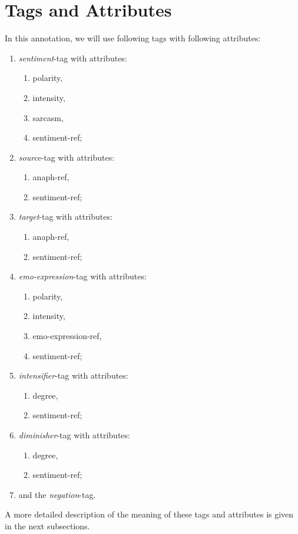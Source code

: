 \documentclass[11pt,a4paper]{article}
\begin{document}

\section{Tags and Attributes}
In this annotation, we will use following tags with following
attributes:
\begin{enumerate}
\item \textit{sentiment}-tag with attributes:
  \begin{enumerate}
  \item polarity,
  \item intensity,
  \item sarcasm,
  \item sentiment-ref;
  \end{enumerate}
\item \textit{source}-tag with attributes:
  \begin{enumerate}
  \item anaph-ref,
  \item sentiment-ref;
  \end{enumerate}
\item \textit{target}-tag with attributes:
  \begin{enumerate}
  \item anaph-ref,
  \item sentiment-ref;
  \end{enumerate}
\item \textit{emo-expression}-tag with attributes:
  \begin{enumerate}
  \item polarity,
  \item intensity,
  \item emo-expression-ref,
  \item sentiment-ref;
  \end{enumerate}
\item \textit{intensifier}-tag with attributes:
  \begin{enumerate}
  \item degree,
  \item sentiment-ref;
  \end{enumerate}
\item \textit{diminisher}-tag with attributes:
  \begin{enumerate}
  \item degree,
  \item sentiment-ref;
  \end{enumerate}
\item and the \textit{negation}-tag.
\end{enumerate}
A more detailed description of the meaning of these tags and
attributes is given in the next subsections.
\end{document}
